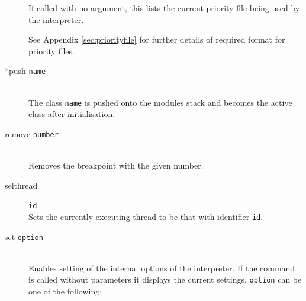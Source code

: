 \documentclass[\pformat,12pt]{article}
\begin{document}
\begin{description}
  If called with no argument, this lists the current priority file being
  used by the interpreter.

  See Appendix \ref{sec:priorityfile} for further details of required
  format for priority files.

\item[*push {\tt name}] \mbox{}\\
  The class {\tt name}\/ is pushed onto the modules stack and becomes
  the active class after initialisation. 

\item[remove \mbox{\texttt{number}}]
\mbox{}\\
  Removes the breakpoint with the given number.
\item[selthread]\texttt{id}\mbox{}\\
  Sets the currently executing thread to be that with identifier
  \texttt{id}.

\item[set {\tt option} \ifthenelse{\boolean{VDMsl}}{\mbox{[{\tt
        argument}]}}{}]\mbox{}\\
  Enables setting of the internal options of the interpreter.  If the
  command is called without parameters it displays the current
  settings. {\tt option}\/ can be one of the following:
  

\end{description}
\end{document}
